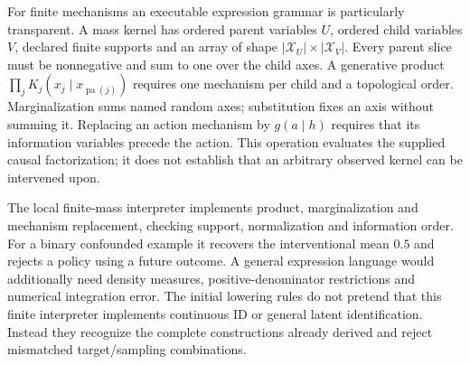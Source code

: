 For finite mechanisms an executable expression grammar is particularly
transparent. A mass kernel has ordered parent variables $U$, ordered child
variables $V$, declared finite supports and an array of shape
$|\mathcal X_U|\times|\mathcal X_V|$. Every parent slice must be
nonnegative and sum to one over the child axes. A generative product
$\prod_jK_j(x_j\mid x_{\operatorname{pa}(j)})$ requires one mechanism
per child and a topological order. Marginalization sums named random axes;
substitution fixes an axis without summing it. Replacing an action mechanism
by $g(a\mid h)$ requires that its information variables precede the action.
This operation evaluates the supplied causal factorization; it does not
establish that an arbitrary observed kernel can be intervened upon.

The local finite-mass interpreter implements product, marginalization and
mechanism replacement, checking support, normalization and information order.
For a binary confounded example it recovers the interventional mean $0.5$
and rejects a policy using a future outcome. A general expression language
would additionally need density measures, positive-denominator restrictions
and numerical integration error. The initial lowering rules do not pretend
that this finite interpreter implements continuous ID or general latent
identification. Instead they recognize the complete constructions already
derived and reject mismatched target/sampling combinations.

